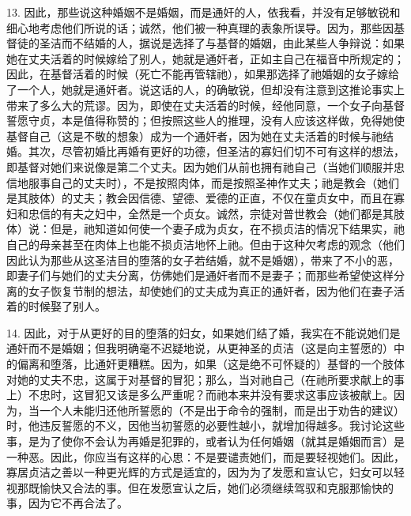 13. 因此，那些说这种婚姻不是婚姻，而是通奸的人，依我看，并没有足够敏锐和细心地考虑他们所说的话；诚然，他们被一种真理的表象所误导。因为，那些因基督徒的圣洁而不结婚的人，据说是选择了与基督的婚姻，由此某些人争辩说：如果她在丈夫活着的时候嫁给了别人，她就是通奸者，正如主自己在福音中所规定的；因此，在基督活着的时候（死亡不能再管辖祂），如果那选择了祂婚姻的女子嫁给了一个人，她就是通奸者。说这话的人，的确敏锐，但却没有注意到这推论事实上带来了多么大的荒谬。因为，即使在丈夫活着的时候，经他同意，一个女子向基督誓愿守贞，本是值得称赞的；但按照这些人的推理，没有人应该这样做，免得她使基督自己（这是不敬的想象）成为一个通奸者，因为她在丈夫活着的时候与祂结婚。其次，尽管初婚比再婚有更好的功德，但圣洁的寡妇们切不可有这样的想法，即基督对她们来说像是第二个丈夫。因为她们从前也拥有祂自己（当她们顺服并忠信地服事自己的丈夫时），不是按照肉体，而是按照圣神作丈夫；祂是教会（她们是其肢体）的丈夫；教会因信德、望德、爱德的正直，不仅在童贞女中，而且在寡妇和忠信的有夫之妇中，全然是一个贞女。诚然，宗徒对普世教会（她们都是其肢体）说：但是，祂知道如何使一个妻子成为贞女，在不损贞洁的情况下结果实，祂自己的母亲甚至在肉体上也能不损贞洁地怀上祂。但由于这种欠考虑的观念（他们因此认为那些从这圣洁目的堕落的女子若结婚，就不是婚姻），带来了不小的恶，即妻子们与她们的丈夫分离，仿佛她们是通奸者而不是妻子；而那些希望使这样分离的女子恢复节制的想法，却使她们的丈夫成为真正的通奸者，因为他们在妻子活着的时候娶了别人。\par

14. 因此，对于从更好的目的堕落的妇女，如果她们结了婚，我实在不能说她们是通奸而不是婚姻；但我明确毫不迟疑地说，从更神圣的贞洁（这是向主誓愿的）中的偏离和堕落，比通奸更糟糕。因为，如果（这是绝不可怀疑的）基督的一个肢体对她的丈夫不忠，这属于对基督的冒犯；那么，当对祂自己（在祂所要求献上的事上）不忠时，这冒犯又该是多么严重呢？而祂本来并没有要求这事应该被献上。因为，当一个人未能归还他所誓愿的（不是出于命令的强制，而是出于劝告的建议）时，他违反誓愿的不义，因他当初誓愿的必要性越小，就增加得越多。我讨论这些事，是为了使你不会认为再婚是犯罪的，或者认为任何婚姻（就其是婚姻而言）是一种恶。因此，你应当有这样的心思：不是要谴责她们，而是要轻视她们。因此，寡居贞洁之善以一种更光辉的方式是适宜的，因为为了发愿和宣认它，妇女可以轻视那既愉快又合法的事。但在发愿宣认之后，她们必须继续驾驭和克服那愉快的事，因为它不再合法了。\par

